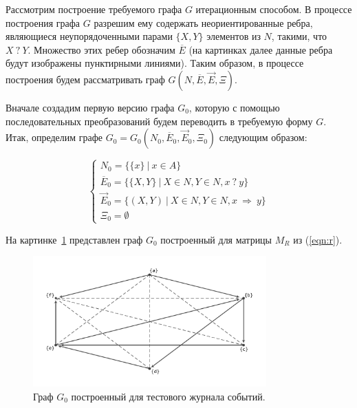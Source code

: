\documentclass[
11pt,%
tightenlines,%
twoside,%
onecolumn,%
nofloats,%
nobibnotes,%
nofootinbib,%
superscriptaddress,%
noshowpacs,%
centertags]%
{revtex4}
\begin{document}
Рассмотрим построение требуемого графа $G$ итерационным способом.
В процессе построения графа $G$ разрешим ему содержать неориентированные ребра, являющиеся неупорядоченными парами $\{X, Y \}$ элементов из $N$, такими, что $X \ ? \ Y$.
Множество этих ребер обозначим $\overline{E}$ (на картинках далее данные ребра будут изображены пунктирными линиями).
Таким образом, в процессе построения будем рассматривать граф $G(N, \overline{E}, \overrightarrow{E}, \Xi)$.

Вначале создадим первую версию графа $G_0$, которую с помощью последовательных преобразований будем переводить в требуемую форму $G$.
Итак, определим графе $G_0 = G_0(N_0, \overline{E}_0, \overrightarrow{E}_0, \Xi_0)$ следующим образом:

\begin{equation}
\begin{cases}
N_0 = \{ \{x\} \ | \ x \in A \} \\
\overline{E}_0 = \{ \{X, Y\} \ | \ X \in N, Y \in N, x \ ? \ y \} \\
\overrightarrow{E}_0 = \{ (X, Y) \ | \ X \in N, Y \in N, x \ \Rightarrow \ y \} \\
\Xi_0 = \emptyset
\end{cases}
\end{equation}

На картинке~\ref{fig:g_0} представлен граф $G_0$ построенный для матрицы $M_R$ из (\ref{eqn:r}).

\begin{figure}[h]
\setcaptionmargin{5mm}
\onelinecaptionsfalse %
\includegraphics[width=0.8\textwidth]{pics/g_0.pdf}
\caption{Граф $G_0$ построенный для тестового журнала событий.}
\label{fig:g_0}
\end{figure}
\end{document}
